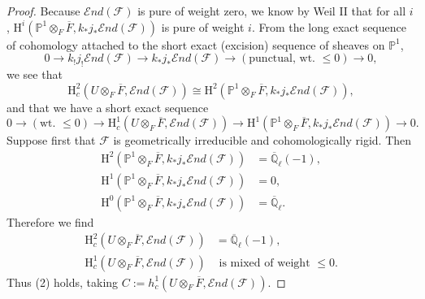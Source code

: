 \begin{proof}
Because \(\mathcal{E}nd(\mathcal{F})\) is pure of weight zero, we know by Weil II \cite[3.2.3]{De-WeilII} that for all \(i\), \(\mathrm{H}^i(\mathbb{P}^1\otimes_F\overline{F},k_*j_*\mathcal{E}nd(\mathcal{F}))\) is pure of weight \(i\). From the long exact sequence of cohomology attached to the short exact (excision) sequence of sheaves on \(\mathbb{P}^1\),
\[
0\to k_!j_!\mathcal{E}nd(\mathcal{F})\to k_*j_*\mathcal{E}nd(\mathcal{F})\to(\text{punctual, wt. }\leq 0)\to0,
\]
we see that
\[
\mathrm{H}^2_c(U\otimes_F\overline{F},\mathcal{E}nd(\mathcal{F}))
\cong \mathrm{H}^2(\mathbb{P}^1\otimes_F\overline{F},k_*j_*\mathcal{E}nd(\mathcal{F})),
\]
and that we have a short exact sequence
\[
0\to(\text{wt. }\leq 0)\to \mathrm{H}^1_c(U\otimes_F\overline{F},\mathcal{E}nd(\mathcal{F}))
\to \mathrm{H}^1(\mathbb{P}^1\otimes_F\overline{F},k_*j_*\mathcal{E}nd(\mathcal{F}))\to0.
\]
Suppose first that \(\mathcal{F}\) is geometrically irreducible and cohomologically rigid. Then
\[
\begin{aligned}
\mathrm{H}^2(\mathbb{P}^1\otimes_F\overline{F},k_*j_*\mathcal{E}nd(\mathcal{F}))&=\overline{\mathbb{Q}}_\ell(-1),\\
\mathrm{H}^1(\mathbb{P}^1\otimes_F\overline{F},k_*j_*\mathcal{E}nd(\mathcal{F}))&=0,\\
\mathrm{H}^0(\mathbb{P}^1\otimes_F\overline{F},k_*j_*\mathcal{E}nd(\mathcal{F}))&=\overline{\mathbb{Q}}_\ell.
\end{aligned}
\]
Therefore we find
\[
\begin{aligned}
\mathrm{H}^2_c(U\otimes_F\overline{F},\mathcal{E}nd(\mathcal{F}))&=\overline{\mathbb{Q}}_\ell(-1),\\
\mathrm{H}^1_c(U\otimes_F\overline{F},\mathcal{E}nd(\mathcal{F}))&\text{ is mixed of weight }\leq 0.
\end{aligned}
\]
Thus (2) holds, taking \(C:=h^1_c(U\otimes_F\overline{F},\mathcal{E}nd(\mathcal{F}))\).


\end{proof}
